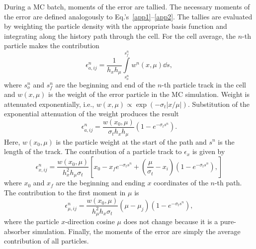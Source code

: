 During a MC batch, moments of the error are tallied.  The necessary moments of the error are
defined analogously to Eq.'s~\eqref{app1}--\eqref{app2}.
The tallies are evaluated by weighting the particle density with the appropriate
basis function and integrating along the history path through the cell.  For the cell average, the $n$-th
particle makes the contribution
\begin{equation}
   \epsilon^n_{a,ij} = \frac{1}{h_xh_\mu} \int\limits_{s^n_o}^{s^n_f}  w^n(x,\mu) \dd s,
\end{equation}
where $s_o^n$ and $s_f^n$ are the beginning and end of the $n$-th particle track in the cell and $w(x,\mu)$ is
the weight of the error particle in the MC simulation.  Weight is attenuated exponentially, i.e., $w(x,\mu)\propto
\exp(-\sigma_t|x/\mu|)$.
Substitution of the exponential attenuation of the weight produces the result
\begin{equation}
    \epsilon^n_{a,ij} = \frac{w(x_0,\mu)}{\sigma_t h_x h_\mu} \left(1 -
    e^{-\sigma_ts^n}\right).
\end{equation}
Here, $w(x_0,\mu)$ is the particle weight at the start of the path and $s^n$ is the
length of the track. The contribution of a
particle track to $\epsilon_x$ is given by
\begin{equation}
    \epsilon^n_{x,ij} = \frac{w(x_0,\mu)}{h_x^2h_\mu \sigma_t} \left[x_0 - x_f e^{-\sigma_t s^n}
        + \left(\frac{\mu}{\sigma_t} - x_i \right)\left(1-e^{-\sigma_t s^n}\right),
    \right]
\end{equation}
where $x_0$ and $x_f$ are the beginning and ending $x$ coordinates of the $n$-th
path.  The contribution to the first moment in $\mu$ is 
\begin{equation}
    \epsilon^n_{\mu,ij} = \frac{w(x_0,\mu)}{h_{\mu}^2h_x\sigma_t}\left(\mu -
    \mu_j\right) \left(1 - e^{-\sigma_ts^n}\right),
\end{equation}
where the particle $x$-direction cosine $\mu$ does not change because it is a pure-absorber simulation.
Finally, the moments of the error are simply the average contribution of all particles.

